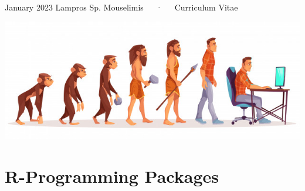 \documentclass[11pt, a4paper]{awesome-cv}
\begin{document}
\makecvheader

\makecvfooter
  {January 2023}
    {Lampros Sp. Mouselimis~~~·~~~Curriculum Vitae}
  {\thepage}





\includegraphics{human_evolution.jpg}

\hypertarget{r-programming-packages}{%
\section{R-Programming Packages}\label{r-programming-packages}}
\end{document}
